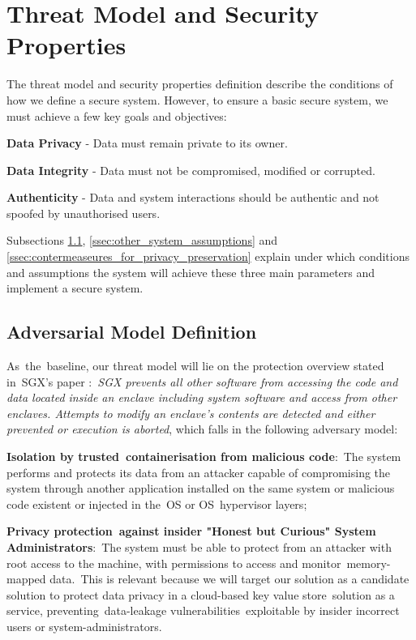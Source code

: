 \section{Threat Model and Security Properties}
\label{sec:threat_model_and_security_properties}

The threat model and security properties definition describe the conditions of how we define a secure system. However, to ensure a basic secure system, we must achieve a few key goals and objectives:
 
\textbf{Data Privacy} - Data must remain private to its owner.

\textbf{Data Integrity} - Data must not be compromised, modified or corrupted.

\textbf{Authenticity} - Data and system interactions should be authentic and not spoofed by unauthorised users.

Subsections \ref{ssec:adversarial_model_definition}, \ref{ssec:other_system_assumptions} and \ref{ssec:contermeaseures_for_privacy_preservation} explain under which conditions and assumptions the system will achieve these three main parameters and implement a secure system.

\subsection{Adversarial Model Definition}
\label{ssec:adversarial_model_definition}
	
As the baseline, our threat model will lie on the protection overview stated in SGX’s paper \cite{sgx:7}: \textit{SGX prevents all other software from accessing the code and data located inside an enclave including system software and access from other enclaves. Attempts to modify an enclave’s contents are detected and either prevented or execution is aborted}, which falls in the following adversary model:

\textbf{Isolation by trusted containerisation from malicious code}: The system performs and protects its data from an attacker capable of compromising the system through another application installed on the same system or malicious code existent or injected in the OS or OS hypervisor layers;

\textbf{Privacy protection against insider "Honest but Curious" System Administrators}: The system must be able to protect from an attacker with root access to the machine, with permissions to access and monitor memory-mapped data. This is relevant because we will target our solution as a candidate solution to protect data privacy in a cloud-based key value store solution as a service, preventing data-leakage vulnerabilities exploitable by insider incorrect users or system-administrators.

